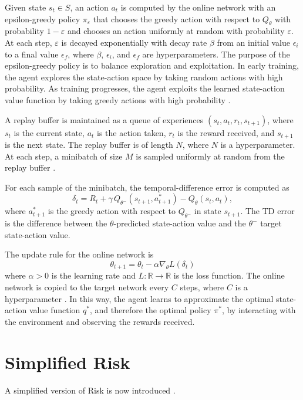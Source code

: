 \documentclass[final,5p,times,twocolumn]{elsarticle}
\begin{document}
Given state $s_{t} \in S$, an action $a_{t}$ is computed by the online network with an epsilon-greedy policy $\pi_{\varepsilon}$ that chooses the greedy action with respect to $Q_{\theta}$ with probability $1 - \varepsilon$ and chooses an action uniformly at random with probability $\varepsilon$. At each step, $\varepsilon$ is decayed exponentially with decay rate $\beta$ from an initial value $\epsilon_{i}$ to a final value $\epsilon_{f}$, where $\beta$, $\epsilon_{i}$, and $\epsilon_{f}$ are hyperparameters. The purpose of the epsilon-greedy policy is to balance exploration and exploitation. In early training, the agent explores the state-action space by taking random actions with high probability. As training progresses, the agent exploits the learned state-action value function by taking greedy actions with high probability \cite{mnih2015human}.

A replay buffer is maintained as a queue of experiences $(s_{t}, a_{t}, r_{t}, s_{t+1})$, where $s_{t}$ is the current state, $a_{t}$ is the action taken, $r_{t}$ is the reward received, and $s_{t+1}$ is the next state. The replay buffer is of length $N$, where $N$ is a hyperparameter. At each step, a minibatch of size $M$ is sampled uniformly at random from the replay buffer \cite{mnih2015human}.

For each sample of the minibatch, the temporal-difference error is computed as 
$$\delta_{t} = R_{t} + \gamma\,Q_{\theta^{-}}(s_{t+1}, a_{t+1}^{*}) - Q_{\theta}(s_{t}, a_{t}),$$
where $a_{t+1}^{*}$ is the greedy action with respect to $Q_{\theta^{-}}$ in state $s_{t+1}$. The TD error is the difference between the $\theta$-predicted state-action value and the $\theta^{-}$ target state-action value.

The update rule for the online network is 
$$\theta_{t+1} = \theta_{t} - \alpha \nabla_{\theta} L(\delta_{t})$$
where $\alpha > 0$ is the learning rate and $L: \mathbb{R} \to \mathbb{R}$ is the loss function. The online network is copied to the target network every $C$ steps, where $C$ is a hyperparameter \cite{van2016deep}. In this way, the agent learns to approximate the optimal state-action value function $q^{*}$, and therefore the optimal policy $\pi^{*}$, by interacting with the environment and observing the rewards received.
\section{Simplified Risk}
\label{sec:risk}

A simplified version of Risk is now introduced \cite{risk1959}.
\end{document}
